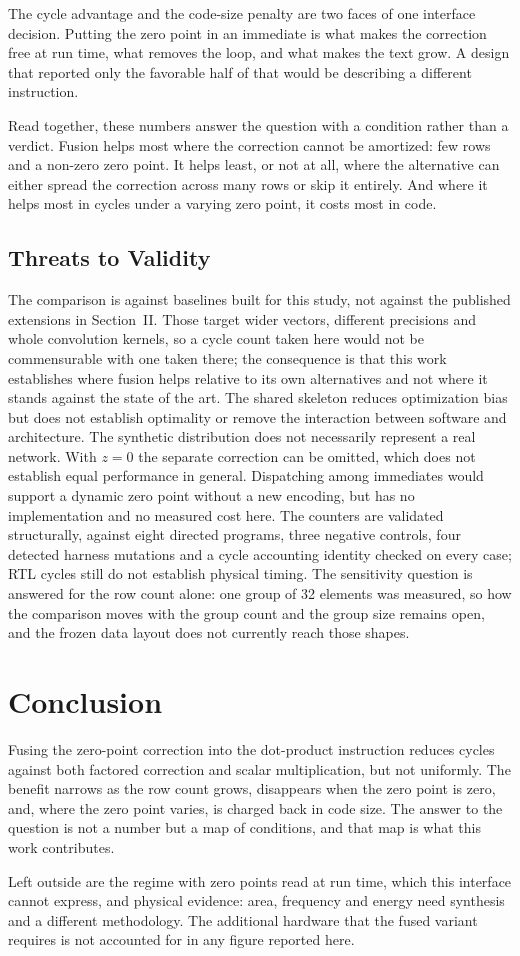 The cycle advantage and the code-size penalty are two faces of one interface
decision. Putting the zero point in an immediate is what makes the correction
free at run time, what removes the loop, and what makes the text grow. A design
that reported only the favorable half of that would be describing a different
instruction.

Read together, these numbers answer the question with a condition rather than a
verdict. Fusion helps most where the correction cannot be amortized: few rows
and a non-zero zero point. It helps least, or not at all, where the alternative
can either spread the correction across many rows or skip it entirely. And
where it helps most in cycles under a varying zero point, it costs most in
code.

\subsection{Threats to Validity}
The comparison is against baselines built for this study, not against the
published extensions in Section~II. Those target wider vectors, different
precisions and whole convolution kernels, so a cycle count taken here would not
be commensurable with one taken there; the consequence is that this work
establishes where fusion helps relative to its own alternatives and not where it
stands against the state of the art. The shared skeleton reduces optimization
bias but does not establish optimality or remove the interaction between
software and architecture. The synthetic
distribution does not necessarily represent a real network. With \(z{=}0\) the
separate correction can be omitted, which does not establish equal performance
in general. Dispatching among immediates would support a dynamic zero point
without a new encoding, but has no implementation and no measured cost here.
The counters are validated structurally, against eight directed programs, three
negative controls, four detected harness mutations and a cycle accounting
identity checked on every case; RTL cycles still do not establish physical
timing. The sensitivity question is answered for the row count alone: one group
of 32 elements was measured, so how the comparison moves with the group count
and the group size remains open, and the frozen data layout does not currently
reach those shapes.

\section{Conclusion}
Fusing the zero-point correction into the dot-product instruction reduces
cycles against both factored correction and scalar multiplication, but not
uniformly. The benefit narrows as the row count grows, disappears when the zero
point is zero, and, where the zero point varies, is charged back in code size.
The answer to the question is not a number but a map of conditions, and that
map is what this work contributes.

Left outside are the regime with zero points read at run time, which this
interface cannot express, and physical evidence: area, frequency and energy
need synthesis and a different methodology. The additional hardware that the
fused variant requires is not accounted for in any figure reported here.
